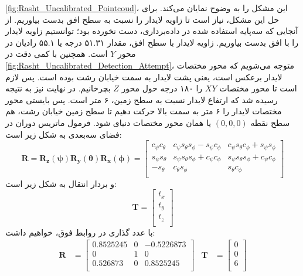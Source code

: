 \cref{fig:Rasht_Uncalibrated_Pointcoud}، این مشکل را به وضوح نمایان می‌کند. برای حل این مشکل، نیاز است تا زاویه لایدار را نسبت به سطح افق بدست بیاوریم. از آنجایی که سه‌‌پایه استفاده شده در داده‌برداری، دست نخورده بود؛ توانستیم زاویه لایدار را با افق بدست بیاوریم. زاویه لایدار با سطح افق، مقدار ۵۱.۳۱ درجه یا ۵۵.۱ رادیان در محور $Y$ است. همچنین با کمی دقت در ‌\cref{fig:Rasht_Uncalibrated_Detection_Attempt}، متوجه می‌شویم که محور مختصات لایدار برعکس است، یعنی پشت لایدار به سمت خیابان رشت بوده است. پس لازم است تا محور مختصات $XY$ را ۱۸۰ درجه حول محور $Z$ بچرخانیم. در نهایت نیز به نتیجه رسیده شد که ارتفاع لایدار نسبت به سطح زمین، ۶ متر است. پس بایستی محور مختصات لایدار را ۶ متر به سمت بالا حرکت دهیم تا سطح زمین خیابان رشت، هم سطح نقطه $(0,0,0)$ یا همان محور مختصات دنیای  شود. فرمول ماتریس دوران در فضای سه‌بعدی به شکل زیر است:
\begin{equation}
    \mathbf{R} = \mathbf{R_z(\psi)}\mathbf{R_y(\theta)}\mathbf{R_x(\phi)} = \begin{bmatrix}
        c_{\psi}c_{\theta} & c_{\psi}s_{\theta}s_{\phi} - s_{\psi}c_{\phi} & c_{\psi}s_{\theta}c_{\phi} + s_{\psi}s_{\phi} \\
        s_{\psi}s_{\theta} & s_{\psi}s_{\theta}s_{\phi} + c_{\psi}c_{\phi} & s_{\psi}s_{\theta}s_{\phi} + c_{\psi}c_{\phi} \\
        -s_{\theta} & c_{\theta}s_{\phi} & s_{\theta}c_{\phi}\\
    \end{bmatrix}
\end{equation}
و بردار انتقال به شکل زیر است:
\begin{equation}
    \mathbf{T} = 
    \begin{bmatrix}
        t_x \\
        t_y \\
        t_z \\
    \end{bmatrix}
\end{equation}
با عدد گذاری در روابط فوق، خواهیم داشت:
\begin{align*}
    \mathbf{R} &= 
    \begin{bmatrix}
        0.8525245 & 0 & -0.5226873 \\
        0 & 1 & 0 \\
        0.526873 & 0 & 0.8525245 \\
    \end{bmatrix}
    &
    \mathbf{T} &= 
    \begin{bmatrix}
        0 \\
        0 \\
        6 \\
    \end{bmatrix}
\end{align*}
